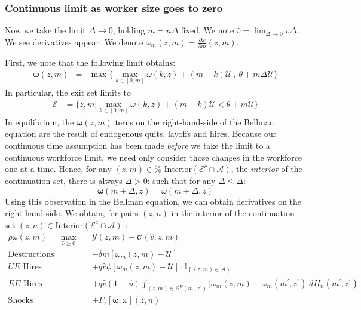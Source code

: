 \subsubsection{Continuous limit as worker size goes to zero}

Now we take the limit $\Delta \to 0$, holding $m = n \Delta$ fixed. We note $%
\widehat{v} = \lim_{\Delta \to 0} v \Delta$. We see derivatives appear. We
denote $\omega_m(z,m) = \frac{\partial \omega}{\partial m}(z,m)$. \newline

First, we note that the following limit obtains:
\begin{eqnarray*}
\pmb{\omega}(z,m) &=& \max \Bigg\{ \max_{k \in [0,m]} \omega(k,z) + (m-k)
\mathcal{U} \ , \ \theta + m \Delta\mathcal{U} \Bigg\}
\end{eqnarray*}
In particular, the exit set limits to
\begin{align*}
\mathcal{E} & =\Bigg\{ z,m\Bigg| \max_{k \in [0,m]} \omega(k,z) + (m-k)
\mathcal{U} < \theta + m \mathcal{U} \Bigg\}
\end{align*}
In equilibrium, the $\pmb{\omega}(z,m)$ terns on the right-hand-side of
the Bellman equation are the result of endogenous quits, layoffs and hires.
Because our continuous time assumption has been made \textit{before} we take
the limit to a continuous workforce limit, we need only consider those
changes in the workforce one at a time. Hence, for any $(z,m) \in \text{%
Interior}(\mathcal{E}^c \cap \mathcal{A})$, the \emph{interior} of the
continuation set, there is always $\overline{ \Delta} > 0$: such that for any $%
\Delta \leq \overline{\Delta}$:
\begin{equation*}
\pmb{\omega}(m\pm \Delta,z) = \omega(m\pm \Delta,z)
\end{equation*}
Using this observation in the Bellman equation, we can obtain derivatives on
the right-hand-side. We obtain, for pairs $(z,n)$ in the interior of the
continuation set $(z,n) \in \text{Interior}(\mathcal{E}^c \cap \mathcal{A})$%
:
\begin{eqnarray*}
\rho \omega \left( z,m\right) =\max_{\widehat{v}\geq 0} && \mathcal{Y} \left(
z,m\right) -\mathcal{C}\left( \widehat{v},z,m\right) \\
\text{Destructions} &&-\delta m [\omega_m(z,m) - \mathcal{U}] \\
\text{$UE$ Hires} &&+q\widehat{v} \phi \left[ \omega_m(z,m) -\mathcal{U}\right]
\cdot \mathbb{I}_{\left\{ \left( z,m\right) \in \mathcal{A}\right\} } \\
\text{$EE$ Hires} &&+q\widehat{v} \left( 1-\phi \right) \int_{\left( z,m\right)
\in \mathcal{Q}^E\left( m^{\prime},z^{\prime }\right) }\Bigg[\omega_m(z,m) -
\omega_m(m^{\prime},z^{\prime}) \Bigg]d\widetilde{H_n}\left( m^{\prime},z^{\prime
}\right) \\
\text{Shocks} &&+\Gamma_z\left[\pmb{\omega},\omega\right](z,n)
\end{eqnarray*}%

